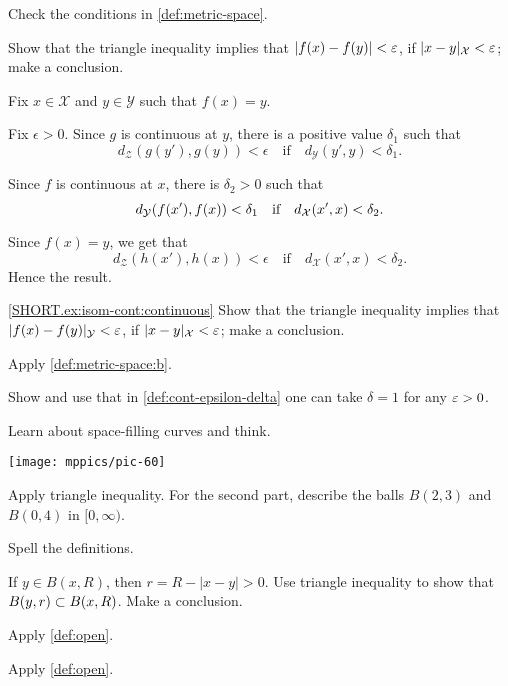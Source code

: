 \begin{multicols}{2}
Check the conditions in \ref{def:metric-space}.

Show that the triangle inequality implies that
$|f(x)-f(y)|<\varepsilon$,
if
$|x-y|_{\mathcal{X}}<\varepsilon$;
make a conclusion.

Fix $x\in \mathcal{X}$ and $y\in\mathcal{Y}$
such that $f(x)=y$.

Fix $\epsilon>0$.
Since $g$ is continuous at $y$, there is a positive value $\delta_1$ such that 
$$d_{\mathcal{Z}}(g(y'),g(y))<\epsilon
\quad
\text{if}
\quad
d_{\mathcal{Y}}(y',y)<\delta_1.$$ 

Since $f$ is continuous at $x$, there is $\delta_2>0$ such that 
$$d_{\mathcal{Y}}(f(x'),f(x))\z<\delta_1
\quad
\text{if}
\quad
d_{\mathcal{X}}(x',x)<\delta_2.$$ 

Since $f(x)=y$, we get that
$$d_{\mathcal{Z}}(h(x'),h(x))<\epsilon
\quad
\text{if}
\quad
d_{\mathcal{X}}(x',x)<\delta_2.$$ 
Hence the result.

 \ref{SHORT.ex:isom-cont:continuous}
Show that the triangle inequality implies that
$|f(x)-f(y)|_{\mathcal{Y}}<\varepsilon$,
if
$|x-y|_{\mathcal{X}}<\varepsilon$;
make a conclusion.

Apply \ref{def:metric-space:b}.

 Show and use that in \ref{def:cont-epsilon-delta} one can take $\delta=1$ for any $\varepsilon>0$.

Learn about space-filling curves and think.


\begin{Figure}
\vskip-0mm
\centering
\texttt{[image: mppics/pic-60]}
\vskip-0mm
\end{Figure}

Apply triangle inequality.
For the second part, describe the balls $B(2,3)$ and $B(0,4)$ in $[0,\infty)$.

Spell the definitions.

If $y\in B(x,R)$, then $r=R-|x-y|>0$.
Use triangle inequality to show that $B(y,r)\z\subset B(x,R)$.
Make a conclusion.

 Apply \ref{def:open}.

 Apply \ref{def:open}.


\end{multicols}
